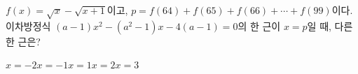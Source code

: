$f(x)=\sqrt{x}-\sqrt{x+1}$이고, $p=f(64)+f(65)+f(66)+\cdots+f(99)$이다. 이차방정식 $(a-1)x^2-(a^2-1)x-4(a-1)=0$의 한 근이 $x=p$일 때, 다른 한 근은? 
\begin{choices32}{$x=-2$}{$x=-1$}{$x=1$}{$x=2$}{$x=3$}\end{choices32}
